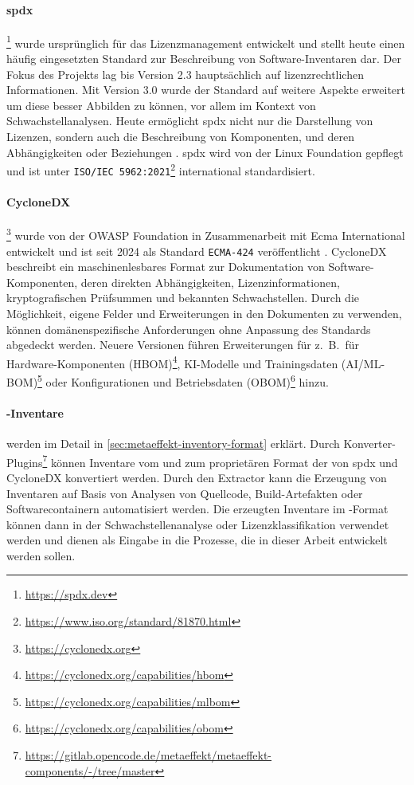 
\paragraph{\acrfull{spdx}}\footnote{\url{https://spdx.dev}}
wurde ursprünglich für das Lizenzmanagement entwickelt und stellt heute einen häufig eingesetzten Standard zur Beschreibung von Software-Inventaren dar.
Der Fokus des Projekts lag bis Version 2.3 hauptsächlich auf lizenzrechtlichen Informationen.
Mit Version 3.0 wurde der Standard auf weitere Aspekte erweitert um diese besser Abbilden zu können, vor allem im Kontext von Schwachstellanalysen.
Heute ermöglicht \acrshort{spdx} nicht nur die Darstellung von Lizenzen, sondern auch die Beschreibung von Komponenten, und deren Abhängigkeiten oder Beziehungen \autocite{spdxOverview1june2024}.
\acrshort{spdx} wird von der Linux Foundation gepflegt und ist unter \texttt{ISO/IEC 5962:2021}\footnote{\url{https://www.iso.org/standard/81870.html}} international standardisiert.

\paragraph{CycloneDX}\footnote{\url{https://cyclonedx.org}}
wurde von der OWASP Foundation in Zusammenarbeit mit Ecma International entwickelt und ist seit 2024 als Standard \texttt{ECMA-424} veröffentlicht \autocite{CycloneDX2024Spec, ecma424:2024}.
CycloneDX beschreibt ein maschinenlesbares Format zur Dokumentation von Software-Komponenten, deren direkten Abhängigkeiten, Lizenzinformationen, kryptografischen Prüfsummen und bekannten Schwachstellen.
Durch die Möglichkeit, eigene Felder und Erweiterungen in den Dokumenten zu verwenden, können domänenspezifische Anforderungen ohne Anpassung des Standards abgedeckt werden.
Neuere Versionen führen Erweiterungen für z.\ B.\ für Hardware-Komponenten (HBOM)\footnote{\url{https://cyclonedx.org/capabilities/hbom}}, KI-Modelle und Trainingsdaten (AI/ML-BOM)\footnote{\url{https://cyclonedx.org/capabilities/mlbom}} oder Konfigurationen und Betriebsdaten (OBOM)\footnote{\url{https://cyclonedx.org/capabilities/obom}} hinzu.

\paragraph{\metaeffekt-Inventare}
werden im Detail in \autoref{sec:metaeffekt-inventory-format} erklärt.
Durch Konverter-Plugins\footnote{\url{https://gitlab.opencode.de/metaeffekt/metaeffekt-components/-/tree/master}} können Inventare vom und zum proprietären Format der \metaeffektsp von \acrshort{spdx} und CycloneDX konvertiert werden.
Durch den \metaeffektsp Extractor kann die Erzeugung von Inventaren auf Basis von Analysen von Quellcode, Build-Artefakten oder Softwarecontainern automatisiert werden.
Die erzeugten Inventare im \metaeffekt-Format können dann in der Schwachstellenanalyse oder Lizenzklassifikation verwendet werden und dienen als Eingabe in die Prozesse, die in dieser Arbeit entwickelt werden sollen.

